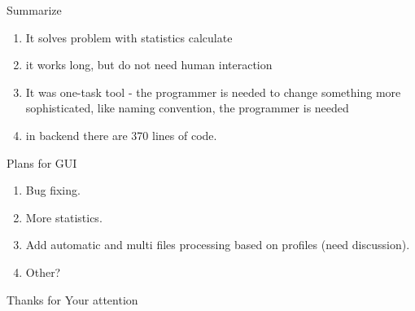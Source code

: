 \documentclass[10pt,usenames,dvipsnames]{beamer}
\begin{document}
\begin{frame}[c]{Summarize}
  \begin{enumerate}
    \item It solves problem with statistics calculate
    \item it works long, but do not need human interaction
    \item It was one-task tool - the programmer is needed to change something more sophisticated, 
      like naming convention,
      the programmer is needed
    \item in backend there are 370 lines of code. 
  \end{enumerate}
  
\end{frame}
\begin{frame}[c]{Plans for GUI}
  \begin{enumerate}
    \item Bug fixing.
    \item More statistics.
    \item Add automatic and multi files processing based on profiles (need discussion).
    \item Other?
  \end{enumerate}  
\end{frame}
\begin{frame}
  \begin{center}
    \Huge Thanks for Your attention
  \end{center}
\end{frame}
\end{document}
